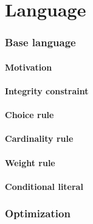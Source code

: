 \part{Language}
\section{Base language}
\subsection{Motivation}

\subsection{Integrity constraint}

\subsection{Choice rule}

\subsection{Cardinality rule}

\subsection{Weight rule}

\subsection{Conditional literal}

\section{Optimization}


